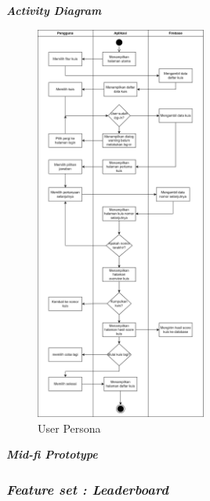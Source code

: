 \textbf{\textit{Activity Diagram}}
\begin{figure}[H]
	\centering
	\includegraphics[width=0.5\textwidth]{contents/chapter-3/images/AD-kuis.png}
	\caption[Caption]{User Persona}
	\label{Fig:UserPersona}
\end{figure}

\textbf{\textit{Mid-fi Prototype}}
\subsubsection{\textit{Feature set : Leaderboard} }


